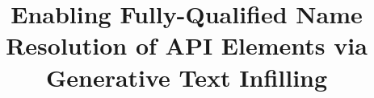 \documentclass[conference]{IEEEtran}
\begin{document}


\title{Enabling Fully-Qualified Name Resolution of API Elements via Generative Text Infilling}


\maketitle
\end{document}
